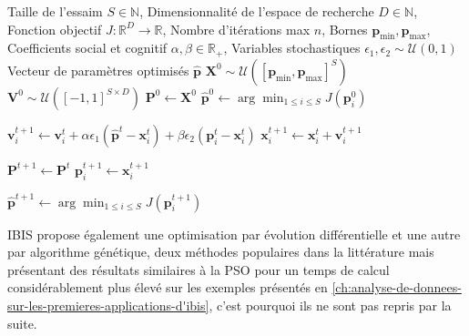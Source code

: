             \begin{algorithm}
                \caption{Optimisation par essaim de particules (PSO)}\label{alg:pso}
                \begin{algorithmic}[1]
                    \Require
                    Taille de l'essaim $S\in\mathbb N$,
                    Dimensionnalité de l'espace de recherche $D\in\mathbb N$,
                    Fonction objectif $J:\mathbb R^D\to\mathbb R$,
                    Nombre d'itérations max $n$,
                    Bornes $\mathbf p_{\min}, \mathbf p_{\max}$,
                    Coefficients social et cognitif $\alpha,\beta \in \mathbb R_+$,
                    Variables stochastiques $\epsilon_1,\epsilon_2 \sim \mathcal U(0,1)$
                    \Ensure Vecteur de paramètres optimisés $\hat {\mathbf{p}}$
                    \State $\mathbf{X}^0 \sim \mathcal U\!\left([\mathbf p_{\min}, \mathbf p_{\max}]^S\right)$
                    \State $\mathbf{V}^0 \sim \mathcal U\!\left([-1,1]^{S \times D}\right)$
                    \State $\mathbf{P}^0 \gets \mathbf{X}^0$
                    \State $\hat{\mathbf{p}}^0 \gets \arg\min_{1 \le i \le S} J(\mathbf{p}_i^0)$


                            \State $\mathbf v_i^{t+1} \gets \mathbf v_i^t
                            + \alpha \epsilon_1 (\hat{\mathbf{p}}^t - \mathbf x_i^t)
                            + \beta \epsilon_2 (\mathbf p_i^t - \mathbf x_i^t)$
                            \State $\mathbf x_i^{t+1} \gets \mathbf x_i^t + \mathbf v_i^{t+1}$
                        \EndFor

                        \State $\mathbf{P}^{t+1} \gets \mathbf{P}^t$
                                \State $\mathbf p_i^{t+1} \gets \mathbf x_i^{t+1}$
                            \EndIf
                        \EndFor

                        \State $\hat{\mathbf{p}}^{t+1} \gets \arg\min_{1 \le i \le S} J(\mathbf p_i^{t+1})$
                    \EndFor
                \end{algorithmic}
            \end{algorithm}

            \begin{bluebox}
                IBIS propose également une optimisation par évolution différentielle et une autre par algorithme génétique,
                deux méthodes populaires dans la littérature mais présentant des résultats similaires à la PSO pour un temps de calcul considérablement plus élevé
                sur les exemples présentés en \ref{ch:analyse-de-donnees-sur-les-premieres-applications-d'ibis}, c'est pourquoi ils ne sont pas repris par la suite.
            \end{bluebox}

